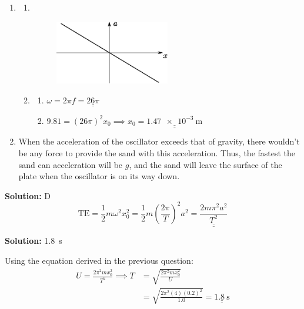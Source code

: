 \documentclass[11pt]{article}
\def\doubleunderline#1{\underline{\underline{#1}}}
\newcommand{\solution}[1]{\textbf{Solution: } #1 \hspace{5mm}}
\begin{document}
\begin{enumerate}[label={[D\arabic*]},itemsep={1em}]
		\item 
			\begin{enumerate}[start=2]
				\item 
					\begin{enumerate}[label={(\roman*)}]
						\item \textcolor{white}{.}
							\begin{figure}[ht!]
								\vspace{-0.7cm}
								\centering
								\includegraphics[width=5cm]{D6.eps}
							\end{figure}
						\item 
							\begin{enumerate}[label={\arabic*.}]
								\item $\omega = 2\pi\! f = \doubleunderline{26\pi}$ 
								\item $9.81 = \left(26\pi\right)^2 x_0 \implies x_0 = \doubleunderline{\SI{1.47e-3}{\meter}}$
							\end{enumerate}
					\end{enumerate}
				\item When the acceleration of the oscillator exceeds that of gravity, there wouldn't be any force to provide the sand with this acceleration. Thus, the fastest the sand can acceleration will be $g$, and the sand will leave the surface of the plate when the oscillator is on its way down. 
			\end{enumerate}
		
		\item \solution{D}
			\begin{equation*}
				\text{TE} = \frac{1}{2}m\omega^2x_0^2 = \frac{1}{2}m\left(\frac{2\pi}{T}\right)^2a^2 = \doubleunderline{\frac{2m\pi^2a^2}{T^2}}
			\end{equation*}
			
		\item \solution{\SI{1.8}{\second}}
			
			Using the equation derived in the previous question:
			\begin{align*}
				U = \frac{2\pi^2mx_0^2}{T^2} \implies T &= \sqrt{\frac{2\pi^2mx_0^2}{U}} \\
				&= \sqrt{\frac{2\pi^2\left(4\right)\left(0.2\right)^2}{1.0}} = \doubleunderline{\SI{1.8}{\second}}
			\end{align*}
		

\end{enumerate}
\end{document}
